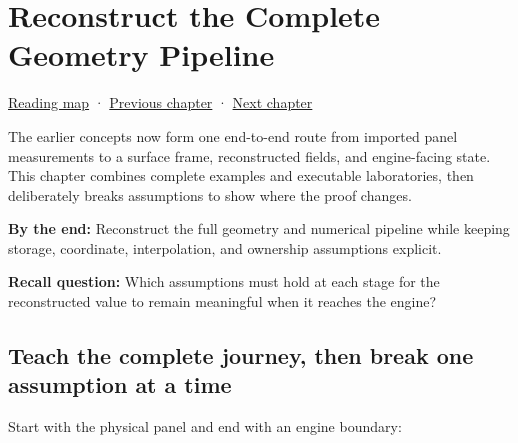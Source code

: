 \chapter{Reconstruct the Complete Geometry Pipeline}\label{02-foundations-ii-ch038-reconstruct-the-complete-geometry-pipeline}\hypertarget{02-foundations-ii-ch038}{}\label{stagechapter:02-foundations-ii-ch038}

\hypertarget{02-foundations-ii-ch038-reconstruct-the-complete-geometry-pipeline}{}

\hyperref[volume-reading-map]{Reading map} · \hyperref[02-foundations-ii-ch037-camera-contracts-and-transform-chain-debugging]{Previous chapter} · \hyperref[03-visual-computing-i-ch001]{Next chapter}

The earlier concepts now form one end-to-end route from imported panel measurements to a surface frame, reconstructed fields, and engine-facing state. This chapter combines complete examples and executable laboratories, then deliberately breaks assumptions to show where the proof changes.

\textbf{By the end:} Reconstruct the full geometry and numerical pipeline while keeping storage, coordinate, interpolation, and ownership assumptions explicit.

\textbf{Recall question:} Which assumptions must hold at each stage for the reconstructed value to remain meaningful when it reaches the engine?

\section{Teach the complete journey, then break one assumption at a time}\label{02-foundations-ii-ch038-teach-the-complete-journey-then-break-one-assumption-at-a-time}

\hypertarget{02-foundations-ii-ch038-teach-the-complete-journey-then-break-one-assumption-at-a-time}{}

Start with the physical panel and end with an engine boundary:

